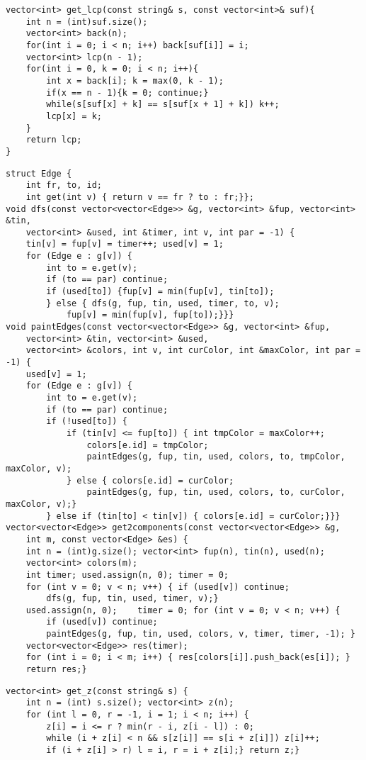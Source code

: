 \documentclass[12pt]{article}
\begin{document}
\begin{verbatim}
vector<int> get_lcp(const string& s, const vector<int>& suf){
    int n = (int)suf.size();
    vector<int> back(n);
    for(int i = 0; i < n; i++) back[suf[i]] = i;
    vector<int> lcp(n - 1);
    for(int i = 0, k = 0; i < n; i++){
        int x = back[i]; k = max(0, k - 1);
        if(x == n - 1){k = 0; continue;}
        while(s[suf[x] + k] == s[suf[x + 1] + k]) k++;
        lcp[x] = k;
    }
    return lcp;
}
\end{verbatim}

\begin{verbatim}
struct Edge {
    int fr, to, id;
    int get(int v) { return v == fr ? to : fr;}};
void dfs(const vector<vector<Edge>> &g, vector<int> &fup, vector<int> &tin, 
    vector<int> &used, int &timer, int v, int par = -1) {
    tin[v] = fup[v] = timer++; used[v] = 1;
    for (Edge e : g[v]) {
        int to = e.get(v);
        if (to == par) continue;
        if (used[to]) {fup[v] = min(fup[v], tin[to]);
        } else { dfs(g, fup, tin, used, timer, to, v);
            fup[v] = min(fup[v], fup[to]);}}}
void paintEdges(const vector<vector<Edge>> &g, vector<int> &fup, 
    vector<int> &tin, vector<int> &used,
    vector<int> &colors, int v, int curColor, int &maxColor, int par = -1) {
    used[v] = 1;
    for (Edge e : g[v]) {
        int to = e.get(v);
        if (to == par) continue;
        if (!used[to]) {
            if (tin[v] <= fup[to]) { int tmpColor = maxColor++;
                colors[e.id] = tmpColor;
                paintEdges(g, fup, tin, used, colors, to, tmpColor, maxColor, v);
            } else { colors[e.id] = curColor;
                paintEdges(g, fup, tin, used, colors, to, curColor, maxColor, v);}
        } else if (tin[to] < tin[v]) { colors[e.id] = curColor;}}}
vector<vector<Edge>> get2components(const vector<vector<Edge>> &g, 
    int m, const vector<Edge> &es) {
    int n = (int)g.size(); vector<int> fup(n), tin(n), used(n); 
    vector<int> colors(m);
    int timer; used.assign(n, 0); timer = 0;
    for (int v = 0; v < n; v++) { if (used[v]) continue;
        dfs(g, fup, tin, used, timer, v);}
    used.assign(n, 0);    timer = 0; for (int v = 0; v < n; v++) {
        if (used[v]) continue;
        paintEdges(g, fup, tin, used, colors, v, timer, timer, -1); }
    vector<vector<Edge>> res(timer);
    for (int i = 0; i < m; i++) { res[colors[i]].push_back(es[i]); }
    return res;}
\end{verbatim}

\begin{verbatim}
vector<int> get_z(const string& s) {
    int n = (int) s.size(); vector<int> z(n);
    for (int l = 0, r = -1, i = 1; i < n; i++) {
        z[i] = i <= r ? min(r - i, z[i - l]) : 0;
        while (i + z[i] < n && s[z[i]] == s[i + z[i]]) z[i]++;
        if (i + z[i] > r) l = i, r = i + z[i];} return z;}
\end{verbatim}
\end{document}
